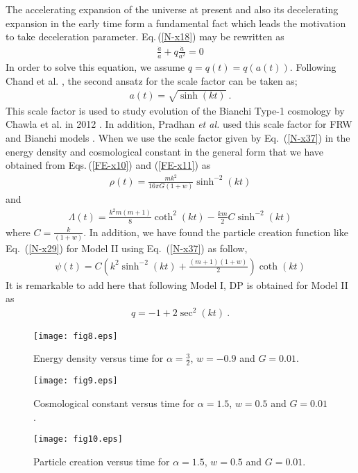\documentclass[superscriptaddress,showpacs,pre,twocolumn]{revtex4-1}
\begin{document}
The accelerating expansion of the universe at present and also its decelerating expansion in the early time form a fundamental fact which leads the motivation to take deceleration parameter. Eq.\,(\ref{N-x18}) may be rewritten as
\begin{eqnarray} \label{N-x36}
\frac{\dot{a}}{a} + q \frac{\dot{a}}{a^{2}} = 0
\end{eqnarray}
In order to solve this equation, we assume $q=q(t)=q(a(t))$. Following Chand et al. \cite{Chand2016}, the second ansatz for the scale factor can be taken as;   
\begin{eqnarray} \label{N-x37}
a(t) = \sqrt{\sinh(kt)} \ .
\end{eqnarray}
This scale factor is used to study evolution of the Bianchi Type-1 cosmology by Chawla et al. in 2012 \cite{Chawlw2012}. In addition, Pradhan \textit{et al.} used this scale factor for FRW and Bianchi models \cite{Pradhan2014b,xPradhan2012,xTiwari2017,xBiski2016}. When we use the scale factor given by Eq.~(\ref{N-x37}) in the energy density and cosmological constant in the general form that we have obtained from Eqs.\,(\ref{FE-x10}) and (\ref{FE-x11}) as
\begin{eqnarray} \label{N-x38}
\rho(t) = \frac{mk^{2}}{16 \pi G (1+w) } \sinh^{-2}(kt)
\end{eqnarray}
and
\begin{eqnarray} \label{N-x39}
\Lambda (t) = \frac{k^{2}m(m+1)}{8} \coth^{2}(kt) - \frac{km}{2}C \sinh^{-2}(kt)
\end{eqnarray}
where $C=\frac{k}{(1+w)}$. 
In addition, we have found the particle creation function like Eq.~(\ref{N-x29}) for Model II using Eq.~(\ref{N-x37}) as follow,
\begin{eqnarray} \label{N-x40}
\psi(t) = C \left( k^{2} \sinh^{-2}(kt) + \frac{(m+1)(1+w)}{2} \right) \coth(kt)
\end{eqnarray}
It is remarkable to add here that  following Model I, DP is obtained for Model II as
\begin{eqnarray} \label{N-x41}
q = -1 + 2 \sec^{2} (kt) \ .
\end{eqnarray}
\begin{figure} [h!]
	\centering
	\texttt{[image: fig8.eps]}
	\caption{Energy density versus time for $\alpha=\frac{3}{2}$, $w=-0.9$ and $G=0.01$.}
	\label{fig-8}
\end{figure}
\begin{figure} [h!]
	\centering
	\texttt{[image: fig9.eps]}
	\caption{Cosmological constant versus time for $\alpha =1.5$, $w = 0.5$ and $G = 0.01$.}
	\label{fig-9}
\end{figure}
\begin{figure} [h!]
	\centering
	\texttt{[image: fig10.eps]}
	\caption{Particle creation versus time for $\alpha =1.5$, $w = 0.5$ and $G = 0.01$.}
	\label{fig-10}
\end{figure}
\end{document}
